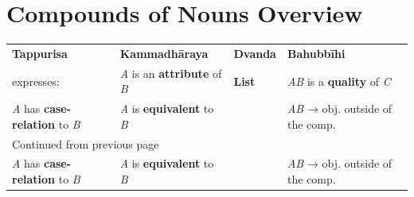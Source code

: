 \documentclass[a4paper]{memoir}
\begin{document}
\section{Compounds of Nouns Overview}
\label{sec:org995a596}

\hspace{-20pt}%
\begin{minipage}{\linewidth+10pt}%

\begin{longtable}{llll}
\textbf{Tappurisa} & \textbf{Kammadhāraya} & \textbf{Dvanda} & \textbf{Bahubbīhi}\\[0pt]
expresses: & \emph{A} is an \textbf{attribute} of \emph{B} & \textbf{List} & \emph{AB} is a \textbf{quality} of \emph{C}\\[0pt]
\emph{A} has \textbf{case-relation} to \emph{B} & \emph{A} is \textbf{equivalent} to \emph{B} &  & \emph{AB} → obj. outside of the comp.\\[0pt]
\hline
\endfirsthead
\multicolumn{4}{l}{Continued from previous page} \\[0pt]

\emph{A} has \textbf{case-relation} to \emph{B} & \emph{A} is \textbf{equivalent} to \emph{B} &  & \emph{AB} → obj. outside of the comp. \\[0pt]


\end{longtable}
\end{minipage}
\end{document}
